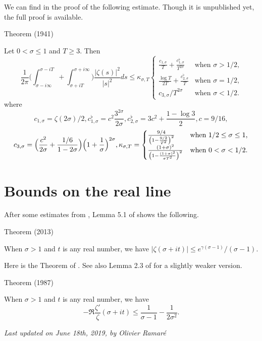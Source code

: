 We can find in
\cite{Helgott*17u} the proof
of the following estimate. Though it is unpublished yet, the full proof
is available.
\begin{thm}{Theorem (1941)}

Let $0 < \sigma\le1$ and $T \ge 3$. Then
  $$
    \frac{1}{2\pi}\biggl(
    \int_{\sigma-i\infty}^{\sigma-iT}
    +
    \int^{\sigma+i\infty}_{\sigma+iT}
    \biggr)
    \frac{|\zeta(s)|^2}{|s|^2}ds\le
    \kappa_{\sigma,T}
    \begin{cases}
    \frac{c_{1,\sigma}}{T}+\frac{c^\flat_{1,\sigma}}{T^{2\sigma}}
    &\text{when $\sigma > 1/2$,}\\
    \frac{\log T}{2T}+\frac{c^\flat_{2,\sigma}}{T}
    &\text{when $\sigma=1/2$,}\\
    c_{3,\sigma}/T^{2\sigma}&\text{when $\sigma < 1/2$.}
    \end{cases}
  $$
 where
$$
c_{1,\sigma}=\zeta(2\sigma)/2,
 c_{1,\sigma}^\flat=c^2 \frac{3^{2\sigma}}{2\sigma},
  c_{2,\sigma}^\flat=3c^2+\frac{1-\log 3}{2},
c=9/16,						  
 $$
 $$
 c_{3,\sigma}=
\Bigl(\frac{c^2}{2\sigma}+\frac{1/6}{1-2\sigma}\Bigr)
\Bigl(1+\frac{1}{\sigma}\Bigr)^{2\sigma},
\kappa_{\sigma,T}=
\begin{cases}
\frac{9/4}{\left(1-\frac{9/2}{T^2}\right)^2}
&\text{when $1/2\le \sigma\le 1$,}\\
\frac{(1+\sigma)^2}{\left(1-\frac{(1+\sigma)^2}{\sigma T^2}\right)^2}
&\text{when $0 < \sigma < 1/2$.}
 \end{cases}
 $$
						  
\end{thm}





\par 
\section{Bounds on the real line}


After some estimates
from \cite{Bastion-Rogalaski*02}, 
Lemma 5.1 of \cite{Ramare*13d} shows
the following.
\par 
\begin{thm}{Theorem (2013)}

  When $\sigma> 1$ and $t$ is any real number, we have $|\zeta(\sigma+it)|\le   e^{\gamma(\sigma-1) }/(\sigma-1)$.
\end{thm}


Here is the Theorem of
\cite{Delange*87}.
See also Lemma 2.3 of
\cite{Ford*01} for a
slightly weaker version.
\par 
\begin{thm}{Theorem (1987)}

  When $\sigma> 1$ and $t$ is any real number, we have
  $$
  -\Re\frac{\zeta'}{\zeta}(\sigma+it)\le
  \frac{1}{\sigma-1}-\frac{1}{2\sigma^2}.
  $$ 
\end{thm}








  
\begin{flushright}\small\sl{}   Last updated on June 18th, 2019, by Olivier Ramar\'e
 \end{flushright}















